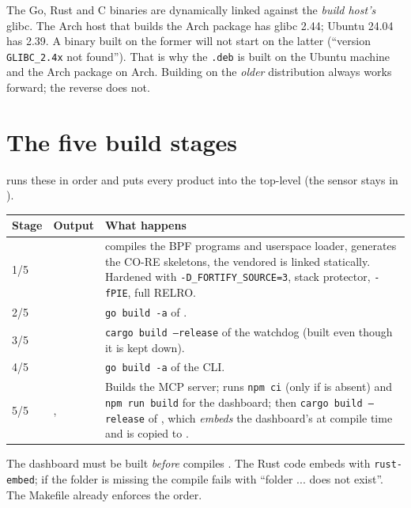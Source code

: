 \begin{kbwarn}
The Go, Rust and C binaries are dynamically linked against the \emph{build host's} glibc. The Arch host that
builds the Arch package has glibc 2.44; Ubuntu 24.04 has 2.39. A binary built on the former will not start
on the latter (``version \texttt{GLIBC\_2.4x} not found''). That is why the \texttt{.deb} is built on the
Ubuntu machine and the Arch package on Arch. Building on the \emph{older} distribution always works
forward; the reverse does not.
\end{kbwarn}

\section{The five build stages}
 runs these in order and puts every product into the top-level 
(the sensor stays in ).
\begin{center}\small
\begin{tabularx}{\textwidth}{@{}L{1.2cm}L{3.2cm}Y@{}}
\toprule
\textbf{Stage} & \textbf{Output} & \textbf{What happens}\\
/5 &  &  compiles the BPF programs and userspace loader,  generates the CO-RE skeletons, the vendored  is linked statically. Hardened with \texttt{-D\_FORTIFY\_SOURCE=3}, stack protector, \texttt{-fPIE}, full RELRO.\\
2/5 &  & \texttt{go build -a} of .\\
3/5 &  & \texttt{cargo build --release} of the watchdog (built even though it is kept down).\\
4/5 &  & \texttt{go build -a} of the CLI.\\
5/5 & ,  & Builds the MCP server; runs \texttt{npm ci} (only if  is absent) and \texttt{npm run build} for the dashboard; then \texttt{cargo build --release} of , which \emph{embeds} the dashboard's  at compile time and is copied to .\\
\bottomrule
\end{tabularx}
\end{center}
\begin{kbnote}
The dashboard must be built \emph{before}  compiles . The Rust code embeds
 with \texttt{rust-embed}; if the folder is missing the compile fails with
``folder ... does not exist''. The Makefile already enforces the order.
\end{kbnote}

